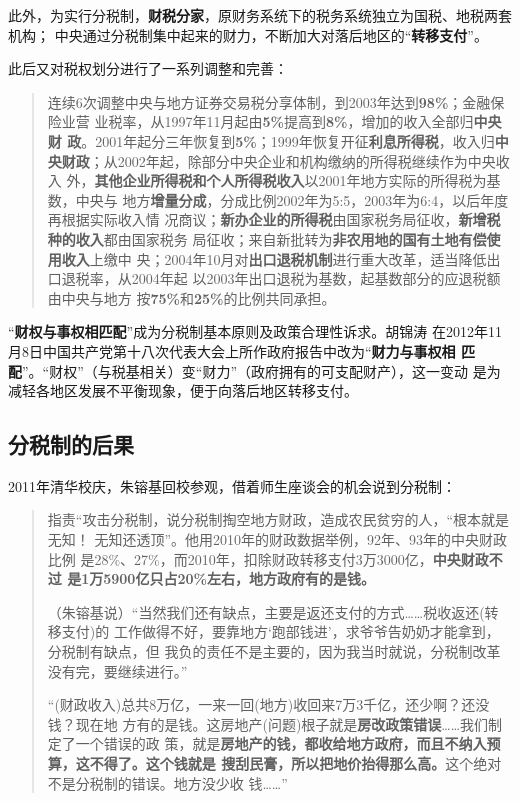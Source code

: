 此外，为实行分税制，\textbf{财税分家}，原财务系统下的税务系统独立为国税、地税两套机构；
中央通过分税制集中起来的财力，不断加大对落后地区的“\textbf{转移支付}”。

此后又对税权划分进行了一系列调整和完善：
\begin{quotation}
  连续6次调整中央与地方证券交易税分享体制，到2003年达到\textbf{98\%}；金融保险业营
  业税率，从1997年11月起由\textbf{5\%}提高到\textbf{8\%}，增加的收入全部归\textbf{中央财
    政}。2001年起分三年恢复到\textbf{5\%}；1999年恢复开征\textbf{利息所得税}，收入归\textbf{中
    央财政}；从2002年起，除部分中央企业和机构缴纳的所得税继续作为中央收入
  外，\textbf{其他企业所得税和个人所得税收入}以2001年地方实际的所得税为基数，中央与
  地方\textbf{增量分成}，分成比例2002年为5:5，2003年为6:4，以后年度再根据实际收入情
  况商议；\textbf{新办企业的所得税}由国家税务局征收，\textbf{新增税种的收入}都由国家税务
  局征收；来自新批转为\textbf{非农用地的国有土地有偿使用收入}上缴中
  央；2004年10月对\textbf{出口退税机制}进行重大改革，适当降低出口退税率，从2004年起
  以2003年出口退税为基数，起基数部分的应退税额由中央与地方
  按\textbf{75\%}和\textbf{25\%}的比例共同承担。\cite{eryuancaizheng}
\end{quotation}

“\textbf{财权与事权相匹配}”成为分税制基本原则及政策合理性诉求。胡锦涛
在2012年11月8日中国共产党第十八次代表大会上所作政府报告中改为“\textbf{财力与事权相
  匹配}”。“财权”（与税基相关）变“财力”（政府拥有的可支配财产），这一变动
是为减轻各地区发展不平衡现象，便于向落后地区转移支付。

\subsection{分税制的后果}


2011年清华校庆，朱镕基回校参观，借着师生座谈会的机会说到分税制：
\begin{quotation}
  指责“攻击分税制，说分税制掏空地方财政，造成农民贫穷的人，“根本就是无知！
  无知还透顶”。他用2010年的财政数据举例，92年、93年的中央财政比例
  是28\%、27\%，而2010年，扣除财政转移支付3万3000亿，\textbf{中央财政不过
    是1万5900亿只占20\%左右，地方政府有的是钱。}

  （朱镕基说）“当然我们还有缺点，主要是返还支付的方式……税收返还(转移支付)的
  工作做得不好，要靠地方‘跑部钱进’，求爷爷告奶奶才能拿到，分税制有缺点，但
  我负的责任不是主要的，因为我当时就说，分税制改革没有完，要继续进行。”

  “(财政收入)总共8万亿，一来一回(地方)收回来7万3千亿，还少啊？还没钱？现在地
  方有的是钱。这房地产(问题)根子就是\textbf{房改政策错误}……我们制定了一个错误的政
  策，就是\textbf{房地产的钱，都收给地方政府，而且不纳入预算，这不得了。这个钱就是
    搜刮民膏，所以把地价抬得那么高。}这个绝对不是分税制的错误。地方没少收
  钱……”
\end{quotation}

